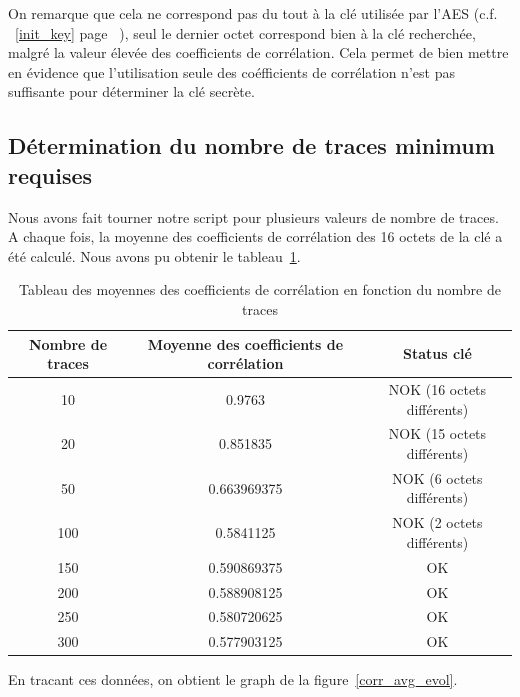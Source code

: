 \documentclass[a4paper, 12pt]{article}
\begin{document}
On remarque que cela ne correspond pas du tout à la clé utilisée par l'AES (c.f. ~\ref{init_key} page ~\pageref{init_key}), seul le dernier octet correspond bien à la clé recherchée, malgré la valeur élevée des coefficients de corrélation. Cela permet de bien mettre en évidence que l'utilisation seule des coéfficients de corrélation n'est pas suffisante pour déterminer la clé secrète. 
		
	\subsection{Détermination du nombre de traces minimum requises}

Nous avons fait tourner notre script pour plusieurs valeurs de nombre de traces. A chaque fois, la moyenne des coefficients de corrélation des 16 octets de la clé a été calculé. Nous avons pu obtenir le tableau~\ref{tab_corr_avg_evol}.

\begin{table}[H]
				\begin{center}
				\begin{tabular}{|c|c|c|}
					\hline
					Nombre de traces & Moyenne des coefficients de corrélation & Status clé \\
					\hline
					10 & 0.9763 & NOK (16 octets différents) \\
					\hline
					20 & 0.851835 & NOK (15 octets différents) \\
					\hline
					50 & 0.663969375 & NOK (6 octets différents) \\
					\hline
					100 & 0.5841125 & NOK (2 octets différents) \\
					\hline
					150 & 0.590869375 & OK \\
					\hline
					200 & 0.588908125 & OK \\
					\hline
					250 & 0.580720625 & OK \\
					\hline
					300 & 0.577903125 & OK \\
					\hline
				\end{tabular}
				\caption{Tableau des moyennes des coefficients de corrélation en fonction du nombre de traces}
				\label{tab_corr_avg_evol}
				\end{center}
			\end{table}

En tracant ces données, on obtient le graph de la figure~\ref{corr_avg_evol}.
\end{document}
